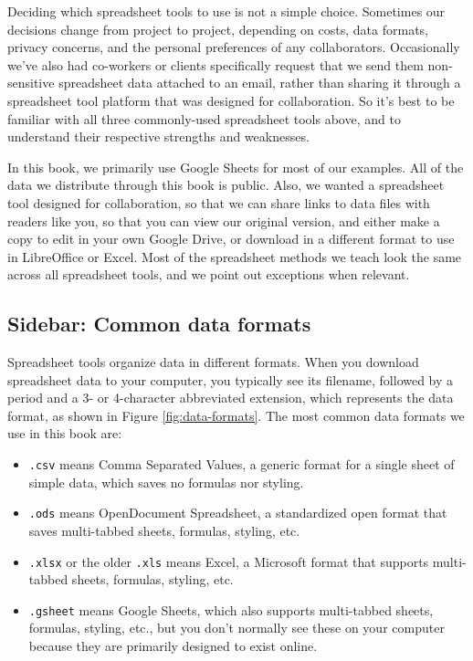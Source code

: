 \documentclass[
  english,
]{book}
\providecommand{\tightlist}{%
  \setlength{\itemsep}{0pt}\setlength{\parskip}{0pt}}
\begin{document}
Deciding which spreadsheet tools to use is not a simple choice. Sometimes our decisions change from project to project, depending on costs, data formats, privacy concerns, and the personal preferences of any collaborators. Occasionally we've also had co-workers or clients specifically request that we send them non-sensitive spreadsheet data attached to an email, rather than sharing it through a spreadsheet tool platform that was designed for collaboration. So it's best to be familiar with all three commonly-used spreadsheet tools above, and to understand their respective strengths and weaknesses.

In this book, we primarily use Google Sheets for most of our examples. All of the data we distribute through this book is public. Also, we wanted a spreadsheet tool designed for collaboration, so that we can share links to data files with readers like you, so that you can view our original version, and either make a copy to edit in your own Google Drive, or download in a different format to use in LibreOffice or Excel. Most of the spreadsheet methods we teach look the same across all spreadsheet tools, and we point out exceptions when relevant.

\hypertarget{sidebar-common-data-formats}{%
\subsection*{Sidebar: Common data formats}\label{sidebar-common-data-formats}}

Spreadsheet tools organize data in different formats. When you download spreadsheet data to your computer, you typically see its filename, followed by a period and a 3- or 4-character abbreviated extension, which represents the data format, as shown in Figure \ref{fig:data-formats}. The most common data formats we use in this book are:

\begin{itemize}
\tightlist
\item
  \texttt{.csv} means Comma Separated Values, a generic format for a single sheet of simple data, which saves no formulas nor styling.
\item
  \texttt{.ods} means OpenDocument Spreadsheet, a standardized open format that saves multi-tabbed sheets, formulas, styling, etc.
\item
  \texttt{.xlsx} or the older \texttt{.xls} means Excel, a Microsoft format that supports multi-tabbed sheets, formulas, styling, etc.
\item
  \texttt{.gsheet} means Google Sheets, which also supports multi-tabbed sheets, formulas, styling, etc., but you don't normally see these on your computer because they are primarily designed to exist online.
\end{itemize}
\end{document}
